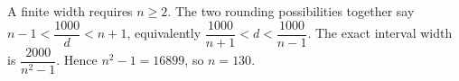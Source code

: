 A finite width requires $n\ge2$. The two rounding possibilities together say $n-1<\dfrac{1000}{d}<n+1$, equivalently $\dfrac{1000}{n+1}<d<\dfrac{1000}{n-1}$. The exact interval width is $\dfrac{2000}{n^2-1}$. Hence $n^2-1=16899$, so $\boxed{n=130}$.
